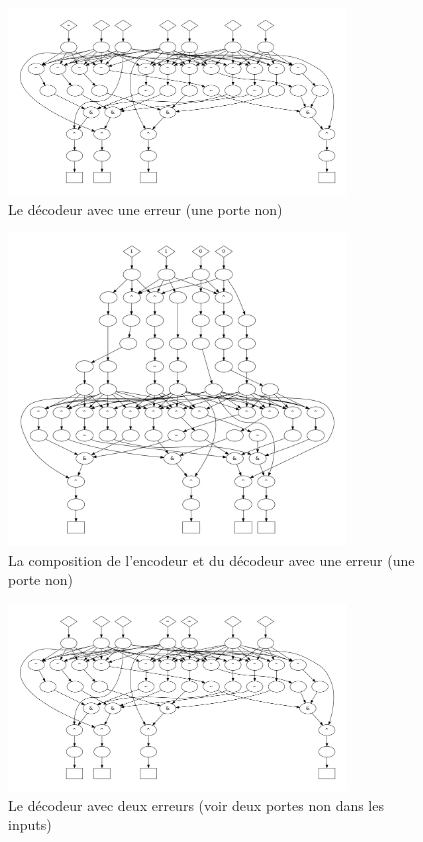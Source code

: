 \documentclass[a4paper,12pt]{article}
\begin{document}
\begin{figure}[H]
    \centering
    \includegraphics[width=0.8\textwidth]{figures/one_error/dec_g.png}
    \caption{Le décodeur avec une erreur (une porte non)}
    \label{fig:decoder-with-one-error}
\end{figure}

\begin{figure}[H]
    \centering
    \includegraphics[width=0.8\textwidth]{figures/one_error/comp.png}
    \caption{La composition de l'encodeur et du décodeur avec une erreur (une porte non)}
    \label{fig:encode-decode-compose-one-error}
\end{figure}

\begin{figure}[H]
    \centering
    \includegraphics[width=0.8\textwidth]{figures/two_errors/decoder.png}
    \caption{Le décodeur avec deux erreurs (voir deux portes non dans les inputs)}
    \label{fig:decoder-two-errors}
\end{figure}
\end{document}
